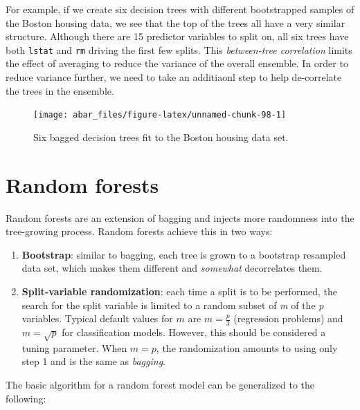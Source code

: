 \documentclass[]{book}
\providecommand{\tightlist}{%
  \setlength{\itemsep}{0pt}\setlength{\parskip}{0pt}}
\theoremstyle{definition}
\theoremstyle{definition}
\theoremstyle{definition}
\theoremstyle{remark}
\begin{document}
For example, if we create six decision trees with different bootstrapped
samples of the Boston housing data, we see that the top of the trees all
have a very similar structure. Although there are 15 predictor variables
to split on, all six trees have both \texttt{lstat} and \texttt{rm}
driving the first few splits. This \emph{between-tree correlation}
limits the effect of averaging to reduce the variance of the overall
ensemble. In order to reduce variance further, we need to take an
additiaonl step to help de-correlate the trees in the ensemble.

\begin{figure}

{\centering \texttt{[image: abar\_files/figure-latex/unnamed-chunk-98-1]} 

}

\caption{Six bagged decision trees fit to the Boston housing data set.}\label{fig:unnamed-chunk-98}
\end{figure}

\hypertarget{random-forests}{%
\section{Random forests}\label{random-forests}}

Random forests are an extension of bagging and injects more randomness
into the tree-growing process. Random forests achieve this in two ways:

\begin{enumerate}
\def\labelenumi{\arabic{enumi}.}
\tightlist
\item
  \textbf{Bootstrap}: similar to bagging, each tree is grown to a
  bootstrap resampled data set, which makes them different and
  \emph{somewhat} decorrelates them.
\item
  \textbf{Split-variable randomization}: each time a split is to be
  performed, the search for the split variable is limited to a random
  subset of \emph{m} of the \emph{p} variables. Typical default values
  for \(m\) are \(m = \frac{p}{3}\) (regression problems) and
  \(m = \sqrt{p}\) for classification models. However, this should be
  considered a tuning parameter. When \(m = p\), the randomization
  amounts to using only step 1 and is the same as \emph{bagging}.
\end{enumerate}

The basic algorithm for a random forest model can be generalized to the
following:
\end{document}
